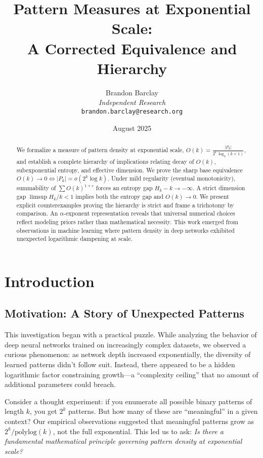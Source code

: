 \documentclass[11pt]{article}
\title{Pattern Measures at Exponential Scale:\\
A Corrected Equivalence and Hierarchy}
\author{Brandon Barclay\\
\textit{Independent Research}\\
\texttt{brandon.barclay@research.org}}
\date{August 2025}
\theoremstyle{definition}
\begin{document}
\maketitle

\begin{abstract}
We formalize a measure of pattern density at exponential scale,
$O(k)=\frac{|P_k|}{2^k\,\log_2(k+1)}$, and establish a complete hierarchy of implications relating decay of $O(k)$, subexponential entropy, and effective dimension. We prove the sharp base equivalence $O(k)\to 0\iff |P_k|=o(2^k\log k)$. Under mild regularity (eventual monotonicity), summability of $\sum O(k)^{1+\varepsilon}$ forces an entropy gap $H_k-k\to-\infty$. A strict dimension gap $\limsup H_k/k<1$ implies both the entropy gap and $O(k)\to 0$. We present explicit counterexamples proving the hierarchy is strict and frame a trichotomy by comparison. An $\alpha$-exponent representation reveals that universal numerical choices reflect modeling priors rather than mathematical necessity. This work emerged from observations in machine learning where pattern density in deep networks exhibited unexpected logarithmic dampening at scale.
\end{abstract}

\section{Introduction}

\subsection{Motivation: A Story of Unexpected Patterns}

This investigation began with a practical puzzle. While analyzing the behavior of deep neural networks trained on increasingly complex datasets, we observed a curious phenomenon: as network depth increased exponentially, the diversity of learned patterns didn't follow suit. Instead, there appeared to be a hidden logarithmic factor constraining growth—a ``complexity ceiling'' that no amount of additional parameters could breach.

Consider a thought experiment: if you enumerate all possible binary patterns of length $k$, you get $2^k$ patterns. But how many of these are ``meaningful'' in a given context? Our empirical observations suggested that meaningful patterns grow as $2^k/\text{polylog}(k)$, not the full exponential. This led us to ask: \textit{Is there a fundamental mathematical principle governing pattern density at exponential scale?}
\end{document}
